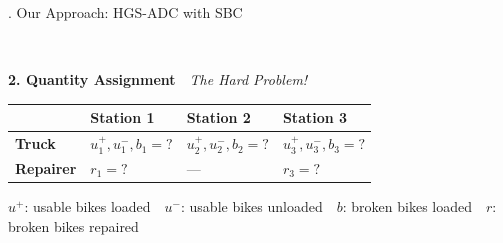 \begin{block}{\fontsize{46}{54}. Our Approach: HGS-ADC with SBC}
\begin{minipage}[t]{0.42\linewidth}
        \vspace{0.4cm}
        \noindent
        {\fontsize{28}{34}\selectfont
        \\[0.2cm]
        }
    \end{minipage}%
    \hfill
    \begin{minipage}[t]{0.56\linewidth}
        \vspace{0pt}
        {\fontsize{40}{48}\selectfont \textbf{\textcolor{AlertRed}{2. Quantity Assignment}}}~~{\fontsize{30}{36}\selectfont \textit{The Hard Problem!}}
        
        \vspace{0.3cm}
        
        {\fontsize{32}{40}\selectfont
        \renewcommand{\arraystretch}{1.6}
        \begin{tabular}{@{}l|>{\centering\arraybackslash}p{0.24\linewidth}>{\centering\arraybackslash}p{0.24\linewidth}>{\centering\arraybackslash}p{0.24\linewidth}@{}}
            & \textbf{Station 1} & \textbf{Station 2} & \textbf{Station 3} \\
            \hline
            \rowcolor{HKUGreen!10} \textcolor{HKUGreen}{\textbf{Truck}} & $u_1^+, u_1^-, b_1{=}?$ & $u_2^+, u_2^-, b_2{=}?$ & $u_3^+, u_3^-, b_3{=}?$ \\
            \rowcolor{AlertRed!10} \textcolor{AlertRed}{\textbf{Repairer}} & $r_1{=}?$ & --- & $r_3{=}?$ \\
        \end{tabular}
        \renewcommand{\arraystretch}{1.0}}
        
        \vspace{0.2cm}
        {\fontsize{28}{34}\selectfont
        $u^+$: usable bikes loaded~~$u^-$: usable bikes unloaded~~$b$: broken bikes loaded~~$r$: broken bikes repaired}
        
        \vspace{0.8cm}
    \end{minipage}
    

\end{block}

